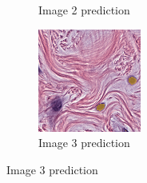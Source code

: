 \begin{figure}[H]
\begin{subfigure}[b]{0.32\textwidth}
    \caption{Image 2 prediction}
  \end{subfigure}\hfill
  \begin{subfigure}[b]{0.32\textwidth}
    \centering
    \includegraphics[width=\linewidth]{assets/images/for_presentation/exp4-3-pred.png}
    \caption{Image 3 prediction}
  \end{subfigure}

  \par\vspace{0.5em}


\end{figure}
